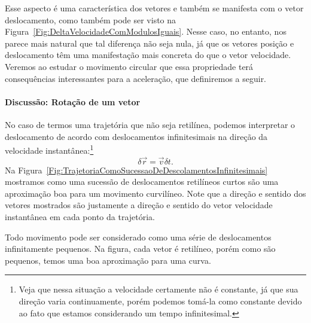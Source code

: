 Esse aspecto é uma característica dos vetores e também se manifesta com o vetor deslocamento, como também pode ser visto na Figura~\ref{Fig:DeltaVelocidadeComModulosIguais}. Nesse caso, no entanto, nos parece mais natural que tal diferença não seja nula, já que os vetores posição e deslocamento têm uma manifestação mais concreta do que o vetor velocidade. Veremos ao estudar o movimento circular que essa propriedade terá consequências interessantes para a aceleração, que definiremos a seguir.

\paragraph{Discussão: Rotação de um vetor}
\label{Disc:RotVetor}

No caso de termos uma trajetória que não seja retilínea, podemos interpretar o deslocamento de acordo com deslocamentos infinitesimais na direção da velocidade instantânea:\footnote[][-1cm]{Veja que nessa situação a velocidade certamente não é constante, já que sua direção varia continuamente, porém podemos tomá-la como constante devido ao fato que estamos considerando um tempo infinitesimal.}
\begin{equation}
	\delta \vec{r} = \vec{v} \delta t.
\end{equation}
%
Na Figura~\ref{Fig:TrajetoriaComoSucessaoDeDescolamentosInfinitesimais} mostramos como uma sucessão de deslocamentos retilíneos curtos são uma aproximação boa para um movimento curvilíneo. Note que a direção e sentido dos vetores mostrados são justamente a direção e sentido do vetor velocidade instantânea em cada ponto da trajetória.

\begin{marginfigure}
\centering
{}
\caption{Todo movimento pode ser considerado como uma série de deslocamentos infinitamente pequenos. Na figura, cada vetor é retilíneo, porém como são pequenos, temos uma boa aproximação para uma curva.\label{Fig:TrajetoriaComoSucessaoDeDescolamentosInfinitesimais}}
\end{marginfigure}

